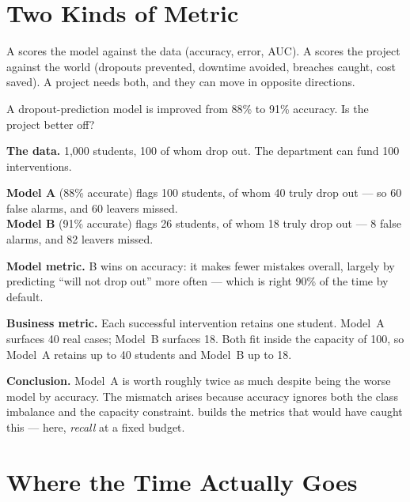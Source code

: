 \section{Two Kinds of Metric}

\begin{definitionbox}
A  scores the model against the data (accuracy, error, AUC). A
 scores the project against the world (dropouts prevented,
downtime avoided, breaches caught, cost saved). A project needs both, and they can
move in opposite directions.
\end{definitionbox}

\begin{worked}
A dropout-prediction model is improved from 88\% to 91\% accuracy. Is the project
better off?

\smallskip
\textbf{The data.} 1{,}000 students, 100 of whom drop out. The department can fund
100 interventions.

\textbf{Model A} (88\% accurate) flags 100 students, of whom 40 truly drop out
--- so 60 false alarms, and 60 leavers missed.\\
\textbf{Model B} (91\% accurate) flags 26 students, of whom 18 truly drop out
--- 8 false alarms, and 82 leavers missed.

\textbf{Model metric.} B wins on accuracy: it makes fewer mistakes overall,
largely by predicting ``will not drop out'' more often --- which is right 90\% of
the time by default.

\textbf{Business metric.} Each successful intervention retains one student.
Model~A surfaces 40 real cases; Model~B surfaces 18. Both fit inside the capacity
of 100, so Model~A retains up to 40 students and Model~B up to 18.

\textbf{Conclusion.} Model~A is worth roughly twice as much despite being the
worse model by accuracy. The mismatch arises because accuracy ignores both the
class imbalance and the capacity constraint.  builds the metrics
that would have caught this --- here, \emph{recall} at a fixed budget.
\end{worked}

\section{Where the Time Actually Goes}

